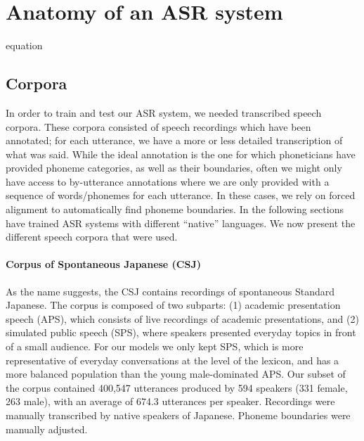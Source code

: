 








\section{Anatomy of an ASR system}
{\color{red} equation}
\subsection{Corpora}

In order to train and test our ASR system, we needed transcribed speech corpora. These corpora consisted of speech recordings which have been annotated; for each utterance, we have a more or less detailed transcription of what was said.
While the ideal annotation is the one for which phoneticians have provided phoneme categories, as well as their boundaries, often we might only have access to by-utterance annotations where we are only provided with a sequence of words/phonemes for each utterance. In these cases, we rely on forced alignment to automatically find phoneme boundaries.
In the following sections have trained ASR systems with different ``native'' languages. We now present the different speech corpora that were used. 

\paragraph{Corpus of Spontaneous Japanese (CSJ)}
As the name suggests, the CSJ \cite{maekawa2003} contains recordings of spontaneous Standard Japanese. The corpus is composed of two subparts: (1) academic presentation speech (APS), which consists of live recordings of academic presentations, and (2) simulated public speech (SPS), where speakers presented everyday topics in front of a small audience. For our models we only kept SPS, which is more representative of everyday conversations at the level of the lexicon, and has a more balanced population than the young male-dominated APS.
Our subset of the corpus contained 400,547 utterances produced by 594 speakers (331 female, 263 male), with an average of 674.3 utterances per speaker.  
Recordings were manually transcribed by native speakers of Japanese. Phoneme boundaries were {\color{red}manually adjusted}.

